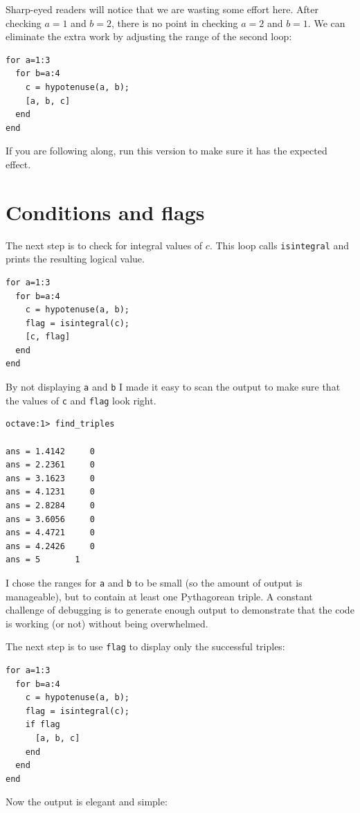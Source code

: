 \documentclass{book}
\begin{document}
Sharp-eyed readers will notice that we are wasting some effort here.
After checking $a=1$ and $b=2$, there is no point in checking
$a=2$ and $b=1$. We can eliminate the extra work by adjusting the
range of the second loop:

\begin{verbatim}
for a=1:3
  for b=a:4
    c = hypotenuse(a, b);
    [a, b, c]
  end
end
\end{verbatim}

If you are following along, run this version to make sure it has
the expected effect.


\section{Conditions and flags}

The next step is to check for integral values of $c$. This
loop calls {\tt isintegral} and prints the resulting logical
value.

\begin{verbatim}
for a=1:3
  for b=a:4
    c = hypotenuse(a, b);
    flag = isintegral(c);
    [c, flag]
  end
end
\end{verbatim}

By not displaying {\tt a} and {\tt b} I made it easy to scan the
output to make sure that the values of {\tt c} and {\tt flag}
look right.

\begin{verbatim}
octave:1> find_triples

ans = 1.4142     0
ans = 2.2361     0
ans = 3.1623     0
ans = 4.1231     0
ans = 2.8284     0
ans = 3.6056     0
ans = 4.4721     0
ans = 4.2426     0
ans = 5       1
\end{verbatim}

I chose the ranges for {\tt a} and {\tt b} to be small
(so the amount of output is manageable), but to contain at
least one Pythagorean triple. A constant challenge of debugging
is to generate enough output to demonstrate that the code is
working (or not) without being overwhelmed.

The next step is to use {\tt flag} to display only the successful
triples:

\begin{verbatim}
for a=1:3
  for b=a:4
    c = hypotenuse(a, b);
    flag = isintegral(c);
    if flag
      [a, b, c]
    end
  end
end
\end{verbatim}

Now the output is elegant and simple:
\end{document}
